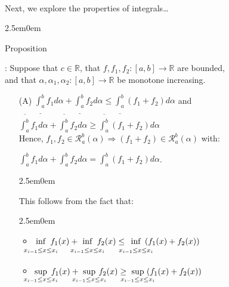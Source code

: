 \documentclass{book}
\newcommand{\hTwo}{%
   \color{MidnightBlue}%
   \fontsize{13}{15}\selectfont%
}
\newcommand{\hThree}{%
   \color{PineGreen!85!Orange}
   \fontsize{13}{15}\selectfont%
}
\newenvironment{myIndent}{%
   \begin{adjustwidth}{2.5em}{0em}%
}{%
   \end{adjustwidth}%
}
\newcounter{PropNumber}
\newcommand{\propCount}[1][1]{%
   \addtocounter{PropNumber}{#1}%
   \thePropNumber%
}
\newcommand{\mySepTwo}[1][.]{%
   {\noindent\color{#1}{\rule{6.5in}{0.5mm}}}\\%
}
\newcommand{\retTwo}{\hfill\bigbreak}
\begin{document}
\mySepTwo

Next, we explore the properties of integrals\ldots\retTwo

{\begin{myIndent}\hTwo
   Proposition \propCount: Suppose that $c \in \mathbb{R}$, that $f, f_1, f_2 : [a, b] \longrightarrow \mathbb{R}$ are bounded,\\ and that $\alpha, \alpha_1, \alpha_2: [a, b] \longrightarrow \mathbb{R}$ be monotone increasing.
   
   \begin{enumerate}
      \item[(A)] {\fontsize{12.5}{14.5}\selectfont$\underline{\int_a^b}f_1d\alpha + \underline{\int_a^b}f_2d\alpha \leq \underline{\int_a^b}(f_1 + f_2)d\alpha$} \hspace{0.2em}and\hspace{0.2em} {\fontsize{12.5}{14.5}\selectfont$\overline{\int_a^b}f_1d\alpha + \overline{\int_a^b}f_2d\alpha \geq \overline{\int_a^b}(f_1 + f_2)d\alpha$}\\
      Hence, $f_1, f_2 \in \mathscr{R}_a^b(\alpha) \Longrightarrow (f_1 + f_2) \in \mathscr{R}_a^b(\alpha)$ with:
      
      {\centering$\int_a^bf_1d\alpha + \int_a^bf_2d\alpha = \int_a^b(f_1 + f_2)d\alpha$.\retTwo\par}

      {\begin{myIndent}\hThree
         This follows from the fact that:
         \begin{myIndent}
            \begin{itemize}
               \item $\hspace{-1.2em}\inf\limits_{x_{i-1}\vphantom{\int^b} \leq x \leq x_i}\hspace{-1.1em}f_1(x) + \hspace{-1.1em}\inf\limits_{x_{i-1} \leq\vphantom{\int^b} x \leq x_i}\hspace{-1.1em}f_2(x) \leq \hspace{-1em}\inf\limits_{x_{i-1} \leq x\vphantom{\int^b} \leq x_i}\hspace{-1em}(f_1(x) + f_2(x))$\\
               
               \item $\hspace{-1.2em}\sup\limits_{x_{i-1} \leq x \leq x_i}\hspace{-1em}f_1(x) + \hspace{-1em}\sup\limits_{x_{i-1} \leq x \leq x_i}\hspace{-1.1em}f_2(x) \geq \hspace{-1em}\sup\limits_{x_{i-1} \leq x \leq x_i}\hspace{-1em}(f_1(x) + f_2(x))$\\
            \end{itemize}
            

\end{myIndent}
\end{myIndent}}
\end{enumerate}
\end{myIndent}}
\end{document}
